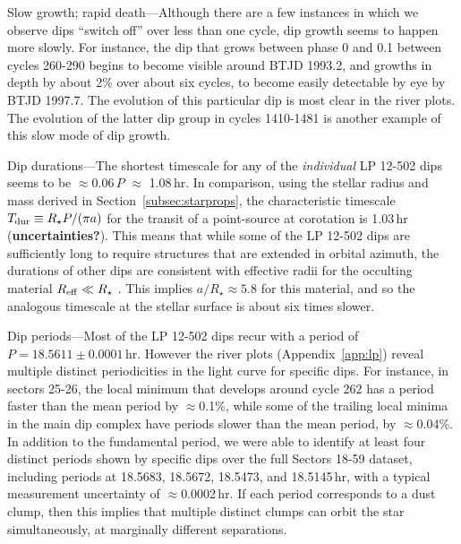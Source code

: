 \documentclass[11pt,twocolumn,tighten]{aastex63}
\begin{document}
{\sc Slow growth; rapid death}---Although there are a few instances in
which we observe dips ``switch off'' over less than one cycle, dip
growth seems to happen more slowly.  For instance, the dip that grows
between phase 0 and 0.1 between cycles 260-290 begins to become
visible around BTJD 1993.2, and growths in depth by about 2\% over
about six cycles, to become easily detectable by eye by BTJD 1997.7.
The evolution of this particular dip is most clear in the river plots.
The evolution of the latter dip group in cycles 1410-1481 is another
example of this slow mode of dip growth.

{\sc Dip durations}---The shortest timescale for any of the {\it
individual} LP 12-502 dips seems to be $\approx$0.06\,$P$ $\approx$
1.08\,hr.  In comparison, using the stellar radius and mass derived in
Section~\ref{subsec:starprops}, the characteristic timescale $T_{\rm
dur} \equiv R_\star P / (\pi a)$ for the transit of a point-source at
corotation is 1.03\,hr ({\bf uncertainties?}).  This means that while
some of the LP 12-502 dips are sufficiently long to require structures
that are extended in orbital azimuth, the durations of other dips are
consistent with effective radii for the occulting material $R_{\rm
eff} \ll R_\star$ .  This implies $a/R_\star \approx 5.8$ for this
material, and so the analogous timescale at the stellar surface is
about six times slower.

{\sc Dip periods}---Most of the LP 12-502 dips recur with a period of
$P=18.5611 \pm 0.0001$\,hr.  However the river plots
(Appendix~\ref{app:lp}) reveal multiple distinct periodicities in the
light curve for specific dips.  For instance, in sectors 25-26, the
local minimum that develops around cycle 262 has a period faster than
the mean period by $\approx$0.1\%, while some of the trailing local
minima in the main dip complex have periods slower than the mean
period, by $\approx$0.04\%.  In addition to the fundamental period, we
were able to identify at least four distinct periods shown by specific
dips over the full Sectors 18-59 dataset, including periods at
18.5683, 18.5672, 18.5473, and 18.5145\,hr, with a typical measurement
uncertainty of $\approx$0.0002\,hr.  If each period corresponds to a
dust clump, then this implies that multiple distinct clumps can orbit
the star simultaneously, at marginally different separations.
\end{document}

